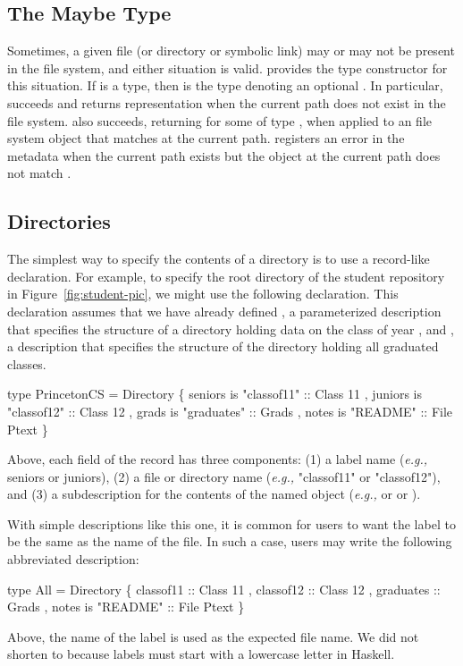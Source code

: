 \subsection{The Maybe Type}
\label{sec:maybe}
Sometimes, a given file (or directory or symbolic link) may or may not
be present in the file system, and either situation is valid.
\forest{} provides the  type constructor for this
situation.  If  is a \forest{} type, then  is the
\forest{} type denoting an optional .  In particular, 
 succeeds and returns representation  when the
current path does not exist in the file system.   also
succeeds, returning  for some  of type , 
when applied to an file system object that matches  at the
current path.   registers an error in the metadata when
the current path exists but the object at the current path does not
match . 


\subsection{Directories}
\label{sec:simple-directories}

The simplest way to specify the contents of a directory is to use
a record-like declaration.  For example, to specify the root directory
of the student repository in Figure~\ref{fig:student-pic}, we might use
the following declaration.  This declaration assumes that we have already
defined , a parameterized description that specifies
the structure of a directory holding data on the class of year ,
and , a description that specifies the structure of the directory holding
all graduated classes.   
\begin{code}
type PrincetonCS = Directory
  \{ seniors is "classof11" :: Class 11
  , juniors is "classof12" :: Class 12
  , grads is "graduates" :: Grads
  , notes is "README" :: File Ptext
  \}
\end{code}
Above, each field of the record has three components:  (1) a label
name ({\it e.g.,} seniors or juniors), (2) a file or directory name
({\it e.g.,} "classof11" or "classof12"), and (3) a \forest{} subdescription
for the contents of the named object ({\it e.g.,}  or 
or ).

With simple descriptions like this one, it is common for users to want
the label to be the same as the name of the file.  In such a case, users
may write the following abbreviated description:
\begin{code}
type All = Directory
  \{ classof11 :: Class 11
  , classof12 :: Class 12
  , graduates :: Grads
  , notes is "README" :: File Ptext
  \}
\end{code}
Above, the name of the label is used as the expected file name.  We did not
shorten  to  because labels must start
with a lowercase letter in Haskell.

